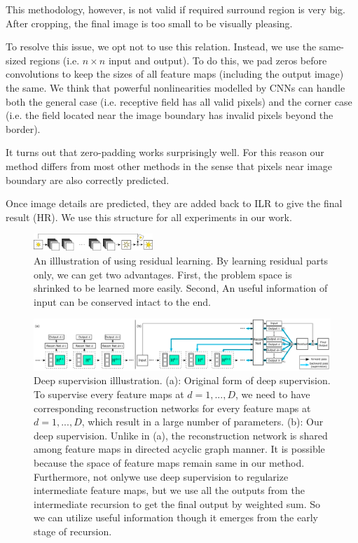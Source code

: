 \documentclass[10pt,twocolumn,letterpaper]{article}
\begin{document}
This methodology, however, is not valid if required surround region is very big. After cropping, the final image is too small to be visually pleasing.

To resolve this issue, we opt not to use this relation. Instead, we use the same-sized regions (i.e. $n\times n$ input and output). To do this, we pad zeros before convolutions to keep the sizes of all feature maps (including the output image) the same. We think that powerful nonlinearities modelled by CNNs can handle both the general case (i.e. receptive field has all valid pixels) and the corner case (i.e. the field located near the image boundary has invalid pixels beyond the border).

It turns out that zero-padding works surprisingly well. For this reason our method differs from most other methods in the sense that pixels near image boundary are also correctly predicted. 

Once image details are predicted, they are added back to ILR to give the final result (HR). We use this structure for all experiments in our work.  

\begin{figure}
\begin{center}
	\includegraphics[width=0.4\textwidth]{figs/f4}
	\caption{An illlustration of using residual learning. By learning residual parts only, we can get two advantages. First, the problem space is shrinked to be learned more easily. Second, An useful information of input can be conserved intact to the end.}
\end{center}
\end{figure}

\begin{figure}
\begin{center}
	\includegraphics[width=\textwidth]{figs/f3}
	\caption{Deep supervision illlustration. (a): Original form of deep supervision. To supervise every feature maps at $d = 1, ..., D$, we need to have corresponding reconstruction networks for every feature maps at $d = 1, ..., D$, which result in a large number of parameters. (b): Our deep supervision. Unlike in (a), the reconstruction network is shared among feature maps in directed acyclic graph manner. It is possible because the space of feature maps remain same in our method. Furthermore, not onlywe use deep supervision to regularize intermediate feature maps, but we use all the outputs from the intermediate recursion to get the final output by weighted sum. So we can utilize useful information though it emerges from the early stage of recursion.}
\end{center}
\end{figure}
\end{document}
